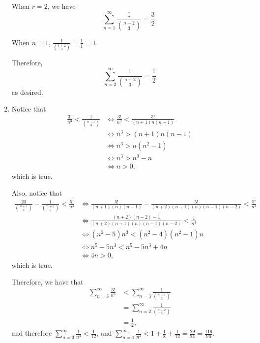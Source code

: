 \begin{enumerate}
          When \(r = 2\), we have
          \[
              \sum_{n = 1}^{\infty} \frac{1}{\binom{n+2}{3}} = \frac{3}{2}.
          \]

          When \(n = 1\), \(\frac{1}{\binom{1 + 2}{3}} = \frac{1}{1} = 1\).

          Therefore,
          \[
              \sum_{n = 2}^{\infty} \frac{1}{\binom{n+2}{3}} = \frac{1}{2}
          \]
          as desired.

    \item Notice that
          \begin{align*}
              \frac{3!}{n^3} < \frac{1}{\binom{n+1}{3}} & \iff \frac{3!}{n^3} < \frac{3!}{(n+1)n(n-1)} \\
                                                        & \iff n^3 > (n+1)n(n-1)                       \\
                                                        & \iff n^3 > n(n^2 - 1)                        \\
                                                        & \iff n^3 > n^3 - n                           \\
                                                        & \iff n > 0,
          \end{align*}
          which is true.

          Also, notice that
          \begin{align*}
              \frac{20}{\binom{n+1}{3}} - \frac{1}{\binom{n+2}{5}} < \frac{5!}{n^3} & \iff \frac{5!}{(n+1)(n)(n-1)} - \frac{5!}{(n+2)(n+1)(n)(n-1)(n-2)} < \frac{5!}{n^3} \\
                                                                                    & \iff \frac{(n+2)(n-2) - 1}{(n+2)(n+1)(n)(n-1)(n-2)} < \frac{1}{n^3}                 \\
                                                                                    & \iff (n^2 - 5)n^3 < (n^2 - 4)(n^2 - 1)n                                             \\
                                                                                    & \iff n^5 - 5n^3 < n^5 - 5n^3 + 4n                                                   \\
                                                                                    & \iff 4n > 0,
          \end{align*}
          which is true.

          Therefore, we have that
          \begin{align*}
              \sum_{n = 3}^{\infty} \frac{3!}{n^3} & < \sum_{n = 3}^{\infty} \frac{1}{\binom{n+1}{3}} \\
                                                   & = \sum_{n = 2}^{\infty} \frac{1}{\binom{n+2}{3}} \\
                                                   & = \frac{1}{2},
          \end{align*}
          and therefore \(\sum_{n = 3}^{\infty} \frac{1}{n^3} < \frac{1}{12}\), and \(\sum_{n = 1}^{\infty} \frac{1}{n^3} < 1 + \frac{1}{8} + \frac{1}{12} = \frac{29}{24} = \frac{116}{96}.\)


\end{enumerate}
